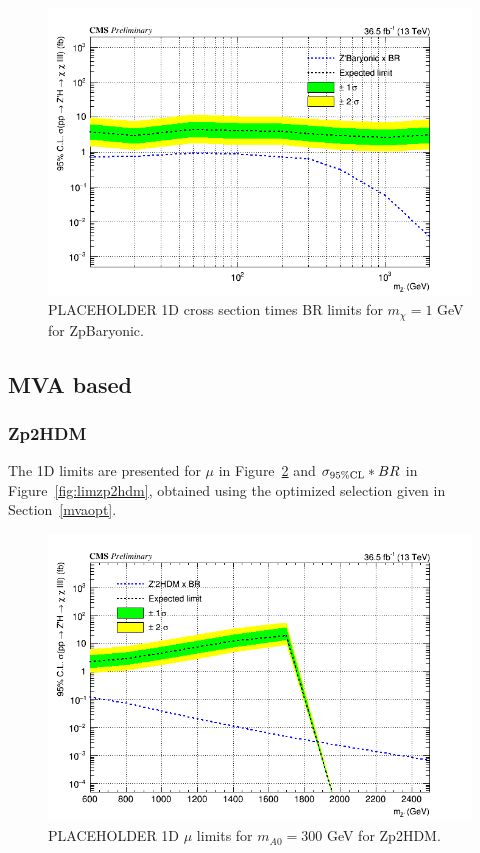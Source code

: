 \begin{figure}[tbh]
\centering
\includegraphics[width=5in]{figures/sigma_limits_4mu_ZpBaryonic.png}
\caption{PLACEHOLDER 1D cross section times BR limits for $m_{\chi} = 1$ GeV for ZpBaryonic.}
\label{fig:limzpbaryonic}
\end{figure}

\subsection{MVA based}

\subsubsection{Zp2HDM}

The 1D limits are presented for $\mu$ in Figure~\ref{fig:limzp2hdmmu} and $\sigma_{95\% \rm{CL}}*BR$ in Figure~\ref{fig:limzp2hdm}, obtained using the optimized selection given in Section~\ref{mvaopt}.

\begin{figure}[tbh]
\centering
\includegraphics[width=5in]{figures/sigma_limits_4mu_Zp2HDM.png}
\caption{PLACEHOLDER 1D $\mu$ limits for $m_{A0} = 300$ GeV for Zp2HDM.}
\label{fig:limzp2hdmmu}
\end{figure}


